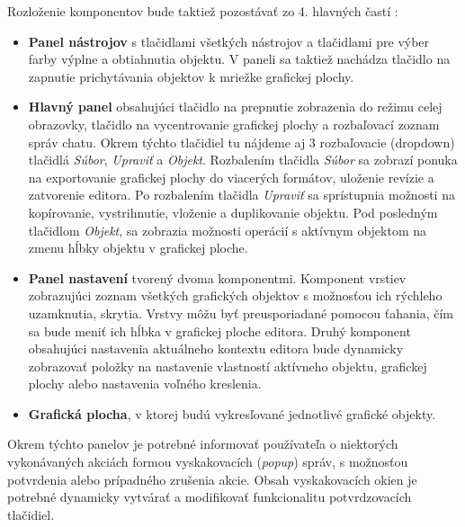 Rozloženie komponentov bude taktiež pozostávať zo 4. hlavných častí :
\begin{itemize}
	\item \textbf{Panel nástrojov} s tlačidlami všetkých nástrojov a tlačidlami pre výber farby výplne a obtiahnutia objektu. V paneli sa taktiež nachádza tlačidlo na zapnutie prichytávania objektov k mriežke grafickej plochy.

	\item \textbf{Hlavný panel} obsahujúci tlačidlo na prepnutie zobrazenia do režimu celej obrazovky, tlačidlo na vycentrovanie grafickej plochy a rozbaľovací zoznam správ chatu. Okrem týchto tlačidiel tu nájdeme aj 3 rozbaľovacie (dropdown) tlačidlá \textit{Súbor}, \textit{Upraviť} a \textit{Objekt}. Rozbalením tlačidla \textit{Súbor} sa zobrazí ponuka na exportovanie grafickej plochy do viacerých formátov, uloženie revízie a zatvorenie editora. Po rozbalením tlačidla \textit{Upraviť} sa sprístupnia možnosti na kopírovanie, vystrihnutie, vloženie a duplikovanie objektu. Pod posledným tlačidlom \textit{Objekt}, sa zobrazia možnosti operácií s aktívnym objektom na zmenu hĺbky objektu v grafickej ploche.

	\item \textbf{Panel nastavení} tvorený dvoma komponentmi. Komponent vrstiev zobrazujúci zoznam všetkých grafických objektov s možnosťou ich rýchleho uzamknutia, skrytia. Vrstvy môžu byť preusporiadané pomocou ťahania, čím sa bude meniť ich hĺbka v grafickej ploche editora. Druhý komponent obsahujúci nastavenia aktuálneho kontextu editora bude dynamicky zobrazovať položky na nastavenie vlastností aktívneho objektu, grafickej plochy alebo nastavenia voľného kreslenia.

	\item \textbf{Grafická plocha}, v ktorej budú vykresľované jednotlivé grafické objekty.
\end{itemize}

Okrem týchto panelov je potrebné informovať používateľa o niektorých vykonávaných akciách formou vyskakovacích (\textit{popup}) správ, s možnosťou potvrdenia alebo prípadného zrušenia akcie. Obsah vyskakovacích okien je potrebné dynamicky vytvárať a modifikovať funkcionalitu potvrdzovacích tlačidiel.

